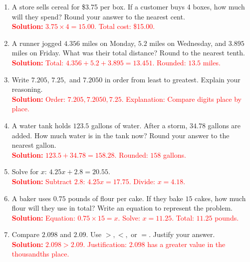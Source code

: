 \documentclass[12pt]{article}
\begin{document}
\begin{tcolorbox}[colframe=black!60, colback=white, 
coltitle=black, colbacktitle=black!15, fonttitle=\bfseries\Large, 
title=Problems, halign title=center, left=10pt, right=10pt, top=10pt, bottom=60pt]
\begin{enumerate}[start=9, itemsep=5em]
    \item A store sells cereal for \$3.75 per box. If a customer buys 4 boxes, how much will they spend? Round your answer to the nearest cent.\\
    \textcolor{red}{\textbf{Solution:} 
    \( 3.75 \times 4 = 15.00 \). Total cost: \$15.00.}

    \item A runner jogged \( 4.356 \) miles on Monday, \( 5.2 \) miles on Wednesday, and \( 3.895 \) miles on Friday. What was their total distance? Round to the nearest tenth.\\
    \textcolor{red}{\textbf{Solution:} 
    Total: \( 4.356 + 5.2 + 3.895 = 13.451 \). Rounded: \( 13.5 \) miles.}

    \item Write \( 7.205 \), \( 7.25, \) and \( 7.2050 \) in order from least to greatest. Explain your reasoning.\\
    \textcolor{red}{\textbf{Solution:} 
    Order: \( 7.205, 7.2050, 7.25 \). 
    Explanation: Compare digits place by place.}

    \item A water tank holds \( 123.5 \) gallons of water. After a storm, \( 34.78 \) gallons are added. How much water is in the tank now? Round your answer to the nearest gallon.\\
    \textcolor{red}{\textbf{Solution:} 
    \( 123.5 + 34.78 = 158.28 \). Rounded: \( 158 \) gallons.}

    \item Solve for \( x \): \( 4.25x + 2.8 = 20.55 \).\\
    \textcolor{red}{\textbf{Solution:} 
    Subtract \( 2.8 \): \( 4.25x = 17.75 \). 
    Divide: \( x = 4.18 \).}

    \item A baker uses \( 0.75 \) pounds of flour per cake. If they bake \( 15 \) cakes, how much flour will they use in total? Write an equation to represent the problem.\\
    \textcolor{red}{\textbf{Solution:} 
    Equation: \( 0.75 \times 15 = x \). 
    Solve: \( x = 11.25 \). Total: \( 11.25 \) pounds.}

    \item Compare \( 2.098 \) and \( 2.09 \). Use \( >, <, \) or \( = \). Justify your answer.\\
    \textcolor{red}{\textbf{Solution:} \( 2.098 > 2.09 \). Justification: \( 2.098 \) has a greater value in the thousandths place.}
\end{enumerate}
\end{tcolorbox}
\end{document}
